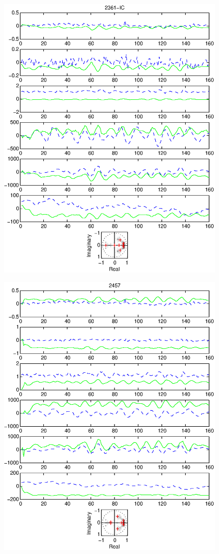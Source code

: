 \documentclass{article}
\begin{document}
\begin{figure}[htb!]\centering
\includegraphics{2361_ic.eps}
\end{figure}\clearpage
\begin{figure}[htb!]\centering
\includegraphics{2457.eps}
\end{figure}\clearpage
\end{document}
